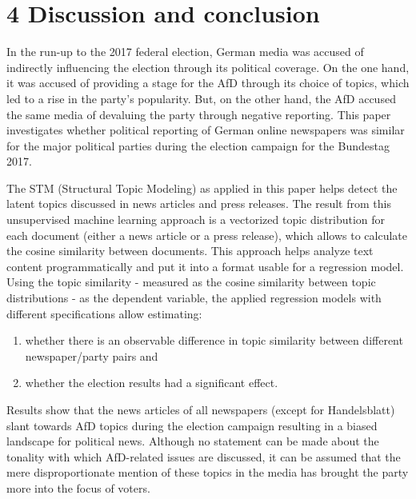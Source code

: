 \documentclass[
  12pt,
]{article}
\providecommand{\tightlist}{%
  \setlength{\itemsep}{0pt}\setlength{\parskip}{0pt}}
\begin{document}
\pagebreak

\hypertarget{discussion-and-conclusion}{%
\section{4 Discussion and conclusion}\label{discussion-and-conclusion}}

In the run-up to the 2017 federal election, German media was accused of
indirectly influencing the election through its political coverage. On
the one hand, it was accused of providing a stage for the AfD through
its choice of topics, which led to a rise in the party's popularity.
But, on the other hand, the AfD accused the same media of devaluing the
party through negative reporting. This paper investigates whether
political reporting of German online newspapers was similar for the
major political parties during the election campaign for the Bundestag
2017.

The STM (Structural Topic Modeling) as applied in this paper helps
detect the latent topics discussed in news articles and press releases.
The result from this unsupervised machine learning approach is a
vectorized topic distribution for each document (either a news article
or a press release), which allows to calculate the cosine similarity
between documents. This approach helps analyze text content
programmatically and put it into a format usable for a regression model.
Using the topic similarity - measured as the cosine similarity between
topic distributions - as the dependent variable, the applied regression
models with different specifications allow estimating:

\begin{enumerate}
\def\labelenumi{\alph{enumi})}
\tightlist
\item
  whether there is an observable difference in topic similarity between
  different newspaper/party pairs and
\item
  whether the election results had a significant effect.
\end{enumerate}

Results show that the news articles of all newspapers (except for
Handelsblatt) slant towards AfD topics during the election campaign
resulting in a biased landscape for political news. Although no
statement can be made about the tonality with which AfD-related issues
are discussed, it can be assumed that the mere disproportionate mention
of these topics in the media has brought the party more into the focus
of voters.
\end{document}
